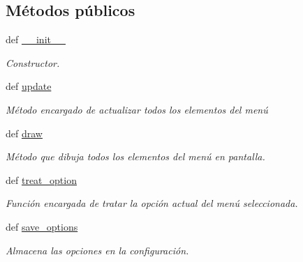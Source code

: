 \subsection*{\-Métodos públicos}
\begin{DoxyCompactItemize}
\item 
def \hyperlink{classengine_1_1optionmenu_1_1OptionMenu_ae743010b9efdde57fadf3c5c9576bda7}{\-\_\-\-\_\-init\-\_\-\-\_\-}
\begin{DoxyCompactList}\small\item\em \-Constructor. \end{DoxyCompactList}\item 
\hypertarget{classengine_1_1optionmenu_1_1OptionMenu_a2425697d48a5d8c844f003ad6637b2aa}{
def \hyperlink{classengine_1_1optionmenu_1_1OptionMenu_a2425697d48a5d8c844f003ad6637b2aa}{update}}
\label{classengine_1_1optionmenu_1_1OptionMenu_a2425697d48a5d8c844f003ad6637b2aa}

\begin{DoxyCompactList}\small\item\em \-Método encargado de actualizar todos los elementos del menú \end{DoxyCompactList}\item 
def \hyperlink{classengine_1_1optionmenu_1_1OptionMenu_af775ea59647f142335f95a1964556290}{draw}
\begin{DoxyCompactList}\small\item\em \-Método que dibuja todos los elementos del menú en pantalla. \end{DoxyCompactList}\item 
\hypertarget{classengine_1_1optionmenu_1_1OptionMenu_a5f9b7aa81785f1a22462fa49bfa636c0}{
def \hyperlink{classengine_1_1optionmenu_1_1OptionMenu_a5f9b7aa81785f1a22462fa49bfa636c0}{treat\-\_\-option}}
\label{classengine_1_1optionmenu_1_1OptionMenu_a5f9b7aa81785f1a22462fa49bfa636c0}

\begin{DoxyCompactList}\small\item\em \-Función encargada de tratar la opción actual del menú seleccionada. \end{DoxyCompactList}\item 
\hypertarget{classengine_1_1optionmenu_1_1OptionMenu_a56f9589bcf2bac168f1fb335bf49ef87}{
def \hyperlink{classengine_1_1optionmenu_1_1OptionMenu_a56f9589bcf2bac168f1fb335bf49ef87}{save\-\_\-options}}
\label{classengine_1_1optionmenu_1_1OptionMenu_a56f9589bcf2bac168f1fb335bf49ef87}

\begin{DoxyCompactList}\small\item\em \-Almacena las opciones en la configuración. \end{DoxyCompactList}\end{DoxyCompactItemize}
